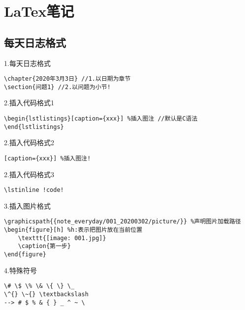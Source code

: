 \chapter{LaTex笔记}
\section{每天日志格式}


1.每天日志格式
\begin{lstlisting}[]
\chapter{2020年3月3日} //1.以日期为章节
\section{问题1} //2.以问题为小节!
\end{lstlisting}

2.插入代码格式1
\begin{lstlisting}[]
\begin{lstlistings}[caption={xxx}] %插入图注 //默认是C语法
\end{lstlistings}
\end{lstlisting}

2.插入代码格式2
\begin{lstlisting}[]
[caption={xxx}] %插入图注!
\end{lstlisting}

2.插入代码格式3
\begin{lstlisting}[]
\lstinline !code!
\end{lstlisting}

3.插入图片格式
\begin{lstlisting}[]
\graphicspath{{note_everyday/001_20200302/picture/}} %声明图片加载路径
\begin{figure}[h] %h:表示把图片放在当前位置
    \texttt{[image: 001.jpg]}
    \caption{第一步}
\end{figure}

\end{lstlisting}


4.特殊符号
\begin{lstlisting}[]
\# \$ \% \& \{ \} \_
\^{} \~{} \textbackslash
--> # $ % & { } _ ^ ~ \
\end{lstlisting}
